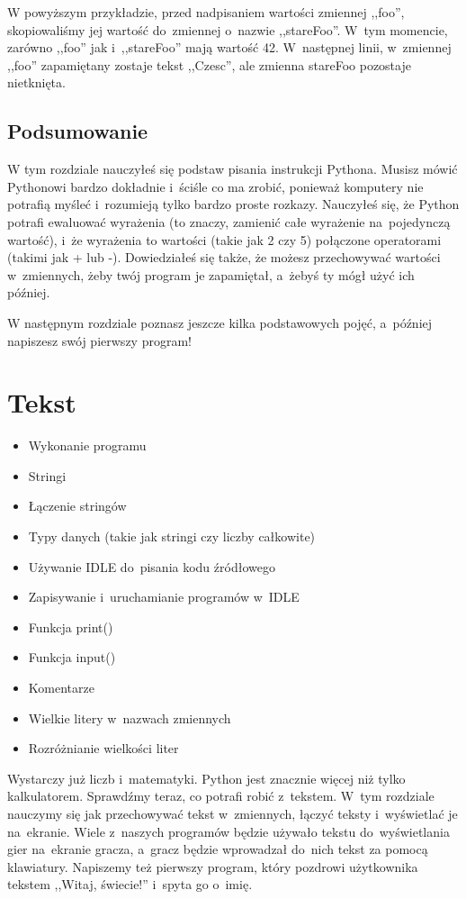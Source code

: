\documentclass{book}
\newcommand{\btopicscovered}{
	\begin{graybox}
	\begin{itemize}
}
\newcommand{\etopicscovered}{
	\end{itemize}
	\end{graybox}
}
\begin{document}
W powyższym przykładzie, przed nadpisaniem wartości zmiennej ,,foo'', skopiowaliśmy jej wartość do~zmiennej o~nazwie ,,stareFoo''. W~tym momencie, zarówno ,,foo'' jak i~,,stareFoo'' mają wartość 42. W~następnej linii, w~zmiennej ,,foo'' zapamiętany zostaje tekst ,,Czesc'', ale zmienna stareFoo pozostaje nietknięta.

\section{Podsumowanie}

W tym rozdziale nauczyłeś się podstaw pisania instrukcji Pythona. Musisz mówić Pythonowi bardzo dokładnie i~ściśle co ma zrobić, ponieważ komputery nie potrafią myśleć i~rozumieją tylko bardzo proste rozkazy. Nauczyłeś się, że Python potrafi ewaluować wyrażenia (to znaczy, zamienić całe wyrażenie na~pojedynczą wartość), i~że wyrażenia to wartości (takie jak 2 czy 5) połączone operatorami (takimi jak + lub -). Dowiedziałeś się także, że możesz przechowywać wartości w~zmiennych, żeby twój program je zapamiętał, a~żebyś ty mógł użyć ich później.

W następnym rozdziale poznasz jeszcze kilka podstawowych pojęć, a~później napiszesz swój pierwszy program!

\chapter{Tekst}

\btopicscovered
	\item Wykonanie programu
	\item Stringi
	\item Łączenie stringów
	\item Typy danych (takie jak stringi czy liczby całkowite)
	\item Używanie IDLE do~pisania kodu źródłowego
	\item Zapisywanie i~uruchamianie programów w~IDLE
	\item Funkcja print()
	\item Funkcja input()
	\item Komentarze
	\item Wielkie litery w~nazwach zmiennych
	\item Rozróżnianie wielkości liter
\etopicscovered

Wystarczy już liczb i~matematyki. Python jest znacznie więcej niż tylko kalkulatorem. Sprawdźmy teraz, co potrafi robić z~tekstem. W~tym rozdziale nauczymy się jak przechowywać tekst w~zmiennych, łączyć teksty i~wyświetlać je na~ekranie. Wiele z~naszych programów będzie używało tekstu do~wyświetlania gier na~ekranie gracza, a~gracz będzie wprowadzał do~nich tekst za pomocą klawiatury. Napiszemy też pierwszy program, który pozdrowi użytkownika tekstem ,,Witaj, świecie!'' i~spyta go o~imię.
\end{document}
